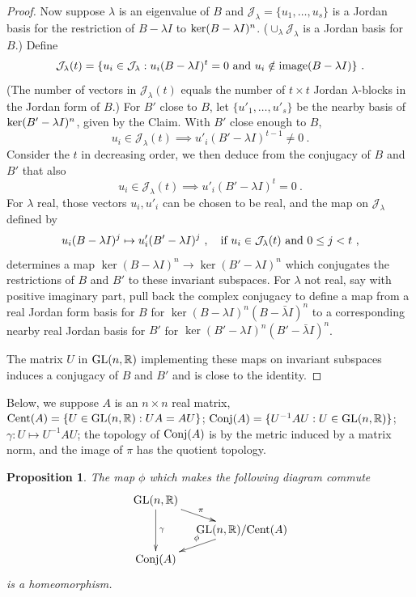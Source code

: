 \documentclass{amsart}
\newtheorem{prop}[theorem]{Proposition}
\theoremstyle{definition}
\theoremstyle{remark}
\numberwithin{equation}{section}
\begin{document}
{{\begin{proof}
Now suppose $\lambda $ is an eigenvalue of $B$ and 
$\mathcal J_{\lambda}= \{u_1, \dots , u_s\}$ is 
a Jordan basis for the restriction of $B-\lambda I$ to 
$\textnormal{ker} (B-\lambda I)^n$. 
($\cup_{\lambda}\mathcal J_{\lambda}$ is a Jordan basis for 
$B$.) 
Define
\[
\mathcal J_{\lambda}(t)= 
\{ u_i \in \mathcal J_{\lambda}: 
u_i(B-\lambda I)^t=0\textnormal{ and }
u_i \notin \textnormal{image}(B-\lambda I)
\}\ . 
\] 
(The number of vectors in
$\mathcal J_{\lambda}(t)$ equals the number of $t\times t$ 
Jordan $\lambda$-blocks  in the Jordan 
form of $B$.) 
For $B'$ close to $B$, 
let $\{u'_1, \dots , u'_s\}$ be the nearby basis of 
$\textnormal{ker} (B'-\lambda I)^n$, given by the Claim. 
With $B'$ close enough to $B$, 
\[
u_i \in \mathcal J_{\lambda}(t) 
\implies 
u'_i(B'-\lambda I)^{t-1}\neq 0 \ . 
\] 
Consider the $t$ in decreasing order, we then deduce 
from the conjugacy of $B$ and $B'$ that also 
\[
u_i \in \mathcal J_{\lambda}(t) 
\implies 
u'_i(B'-\lambda I)^{t}= 0 \ . 
\] 
For $\lambda $ real, those vectors $u_i, u'_i$ can be chosen 
to be real, and the map on 
$\mathcal J_{\lambda}$ defined by 
\[
u_i(B-\lambda I)^j \mapsto u'_i(B'-\lambda I)^j\ , \quad 
\textnormal{if } u_i\in 
\mathcal J_{\lambda}(t) \textnormal{ and } 0\leq j < t \ , 
\] determines a map $\ker(B-\lambda I)^n\to 
\ker(B'-\lambda I)^n$ which conjugates the restrictions of $B$ 
and $B'$ to these invariant subspaces. 
For $\lambda $ not real, say with positive imaginary part, 
pull back the complex conjugacy to define a map from a real 
Jordan form basis for $B$ for $\ker(B-\lambda I)^n(B-\bar\lambda I)^n$ 
to a corresponding nearby real Jordan basis for $B'$ 
for $\ker(B'-\lambda I)^n(B'-\bar\lambda I)^n$. 

The matrix $U $ in $\textnormal{GL}(n,\mathbb R)$ 
implementing these maps on invariant subspaces  
induces a conjugacy of $B$ and $B'$ and is close to the identity. 
\end{proof} 


Below, we suppose $A$ is an $n\times n$ real matrix, 
$\textnormal{Cent}(A)= \{U\in \textnormal{GL}(n,\mathbb R): UA = AU\} $; 
$\textnormal{Conj}(A)= \{U^{-1}AU : U\in \textnormal{GL}(n,\mathbb R)\}$; 
$\gamma : U \mapsto  U^{-1}AU$; the topology of 
$\textnormal{Conj}(A)$ is by the metric induced by a matrix 
norm, and the image of $\pi$ has the quotient topology. 

\begin{prop} \label{fiberprop} 
The map $\phi$ which makes the following diagram commute 
\[
\xymatrix@=
10pt{
\textnormal{GL}(n,\mathbb R)
\ar^{\pi}[rd]  
\ar^{\gamma}[dd] 
&  \\ 
& \textnormal{GL}(n,\mathbb R)/\textnormal{Cent}(A) \ar_{\phi}[dl]   \\ 
\textnormal{Conj}(A) & 
}
\]
is a homeomorphism. 
\end{prop} 

}}
\end{document}

